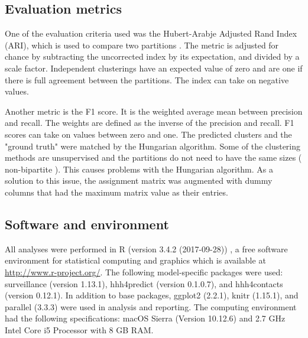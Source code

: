 \documentclass[12pt, a4paper]{article}\usepackage[]{graphicx}\usepackage[]{color}
\begin{document}
\subsection{Evaluation metrics}
One of the evaluation criteria used was the Hubert-Arabje Adjusted Rand Index (ARI), which is used to compare two partitions \citep{hubert1985comparing}. The metric is adjusted for chance by subtracting the uncorrected index by its expectation, and divided by a scale factor. Independent clusterings have an expected value of zero and are one if there is full agreement between the partitions. The index can take on negative values.

Another metric is the F1 score. It is the weighted average mean between precision and recall. The weights are defined as the inverse of the precision and recall. F1 scores can take on values between zero and  one. The predicted clusters and the "ground truth" were matched by the Hungarian algorithm. Some of the clustering methods are unsupervised and the partitions do not need to have the same sizes ( non-bipartite ). This causes problems with the Hungarian algorithm. As a solution to this issue, the assignment matrix was augmented with dummy columns that had the maximum matrix value as their entries.
\subsection{Software and environment}
All analyses were performed in R (version 3.4.2 (2017-09-28)) \citep{R}, a free software environment for statistical computing and graphics which is available at \url{http://www.r-project.org/}. The following model-specific packages were used: surveillance (version 1.13.1), hhh4predict (version 0.1.0.7), and hhh4contacts (version 0.12.1). In addition to base packages, ggplot2 (2.2.1), knitr (1.15.1), and parallel (3.3.3) were used in analysis and reporting. The computing environment had the following specifications: macOS Sierra (Version 10.12.6) and 2.7 GHz Intel Core i5 Processor with 8 GB RAM.
\end{document}
